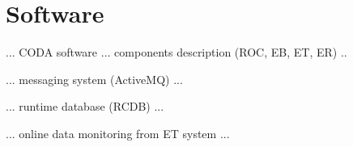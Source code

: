 \section{Software}

... CODA software ... components description (ROC, EB, ET, ER) ..

... messaging system (ActiveMQ) ...

... runtime database (RCDB) ...

... online data monitoring from ET system ...



